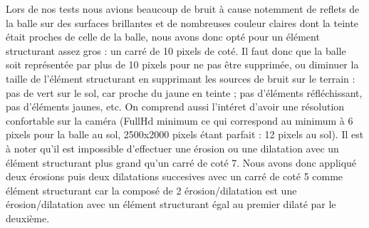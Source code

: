 Lors de nos tests nous avions beaucoup de bruit à cause notemment de reflets de la balle sur des surfaces brillantes et de nombreuses couleur claires dont la teinte était proches de celle de la balle, nous avons donc opté pour un élément structurant assez gros : un carré de 10 pixels de coté. Il faut donc que la balle soit représentée par plus de 10 pixels pour ne pas être supprimée, ou diminuer la taille de l'élément structurant en supprimant les sources de bruit sur le terrain : pas de vert sur le sol, car proche du jaune en teinte ; pas d'éléments réfléchissant, pas d'éléments jaunes, etc. On comprend aussi l'intéret d'avoir une résolution confortable sur la caméra (FullHd minimum ce qui correspond au minimum à 6 pixels pour la balle au sol, 2500x2000 pixels étant parfait : 12 pixels au sol). Il est à noter qu'il est impossible d'effectuer une érosion ou une dilatation avec un élément structurant plus grand qu'un carré de coté 7. Nous avons donc appliqué deux érosions puis deux dilatations succesives avec un carré de coté 5 comme élément structurant car la composé de 2 érosion/dilatation est une érosion/dilatation avec un élément structurant égal au premier dilaté par le deuxième.\\



